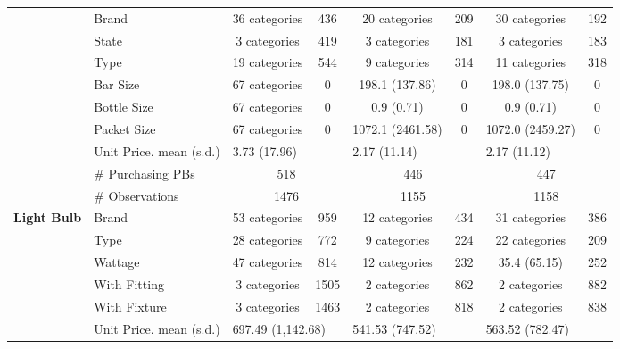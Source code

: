 \begin{longtable}{llccccccccc}
 & Brand & \multicolumn{2}{c}{36 categories} & 436 & \multicolumn{2}{c}{20 categories} & 209 & \multicolumn{2}{c}{30 categories} & 192 \\* 
 & State & \multicolumn{2}{c}{3 categories} & 419 & \multicolumn{2}{c}{3 categories} & 181 & \multicolumn{2}{c}{3 categories} & 183 \\* 
 & Type & \multicolumn{2}{c}{19 categories} & 544 & \multicolumn{2}{c}{9 categories} & 314 & \multicolumn{2}{c}{11 categories} & 318 \\* 
 & Bar Size & \multicolumn{2}{c}{67 categories} & 0 & \multicolumn{2}{c}{198.1 (137.86)} & 0 & \multicolumn{2}{c}{198.0 (137.75)} & 0 \\* 
 & Bottle Size & \multicolumn{2}{c}{67 categories} & 0 & \multicolumn{2}{c}{0.9 (0.71)} & 0 & \multicolumn{2}{c}{0.9 (0.71)} & 0 \\* 
 & Packet Size & \multicolumn{2}{c}{67 categories} & 0 & \multicolumn{2}{c}{1072.1 (2461.58)} & 0 & \multicolumn{2}{c}{1072.0 (2459.27)} & 0 \\* 
 \cmidrule{2-11} 
 & Unit Price. mean (s.d.) & \multicolumn{3}{l}{3.73 (17.96)} & \multicolumn{3}{l}{2.17 (11.14)} & \multicolumn{3}{l}{2.17 (11.12)} \\* 
 & \# Purchasing PBs & \multicolumn{3}{c}{518} & \multicolumn{3}{c}{446} & \multicolumn{3}{c}{447} \\* 
 & \# Observations & \multicolumn{3}{c}{1476} & \multicolumn{3}{c}{1155} & \multicolumn{3}{c}{1158} \\* 
 \midrule 
 \multirow{8}{*}{\textbf{Light Bulb}} & Brand & \multicolumn{2}{c}{53 categories} & 959 & \multicolumn{2}{c}{12 categories} & 434 & \multicolumn{2}{c}{31 categories} & 386 \\* 
 & Type & \multicolumn{2}{c}{28 categories} & 772 & \multicolumn{2}{c}{9 categories} & 224 & \multicolumn{2}{c}{22 categories} & 209 \\* 
 & Wattage & \multicolumn{2}{c}{47 categories} & 814 & \multicolumn{2}{c}{12 categories} & 232 & \multicolumn{2}{c}{35.4 (65.15)} & 252 \\* 
 & With Fitting & \multicolumn{2}{c}{3 categories} & 1505 & \multicolumn{2}{c}{2 categories} & 862 & \multicolumn{2}{c}{2 categories} & 882 \\* 
 \nopagebreak & With Fixture & \multicolumn{2}{c}{3 categories} & 1463 & \multicolumn{2}{c}{2 categories} & 818 & \multicolumn{2}{c}{2 categories} & 838 \\* 
 \nopagebreak \cmidrule{2-11} 
 \nopagebreak & Unit Price. mean (s.d.) & \multicolumn{3}{l}{697.49 (1,142.68)} & \multicolumn{3}{l}{541.53 (747.52)} & \multicolumn{3}{l}{563.52 (782.47)} \\* 

\end{longtable}
